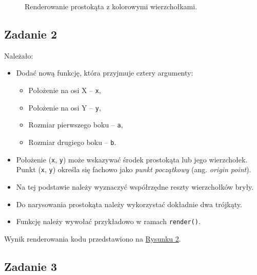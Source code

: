 \documentclass[a4paper, 12pt]{article}
\begin{document}
\begin{figure}[h]
\begin{minipage}{0.45\textwidth}
        \caption{Renderowanie prostokąta z kolorowymi wierzchołkami.}
    \end{minipage}
\end{figure}
\subsection{Zadanie 2}

Należało:
\begin{itemize}
    \item Dodać nową funkcję, która przyjmuje cztery argumenty:
    \begin{itemize}
        \item Położenie na osi X -- \texttt{x},
        \item Położenie na osi Y -- \texttt{y},
        \item Rozmiar pierwszego boku -- \texttt{a},
        \item Rozmiar drugiego boku -- \texttt{b}.
    \end{itemize}
    \item Położenie (\texttt{x}, \texttt{y}) może wskazywać środek prostokąta lub jego wierzchołek. Punkt (\texttt{x}, \texttt{y}) określa się fachowo jako \textit{punkt początkowy} (ang. \textit{origin point}).
    \item Na tej podstawie należy wyznaczyć współrzędne reszty wierzchołków bryły.
    \item Do narysowania prostokąta należy wykorzystać dokładnie dwa trójkąty.
    \item Funkcję należy wywołać przykładowo w ramach \texttt{render()}.
\end{itemize}

Wynik renderowania kodu przedstawiono na \hyperref[fig:zad2]{Rysunku 2}.

\subsection{Zadanie 3}
\end{document}
